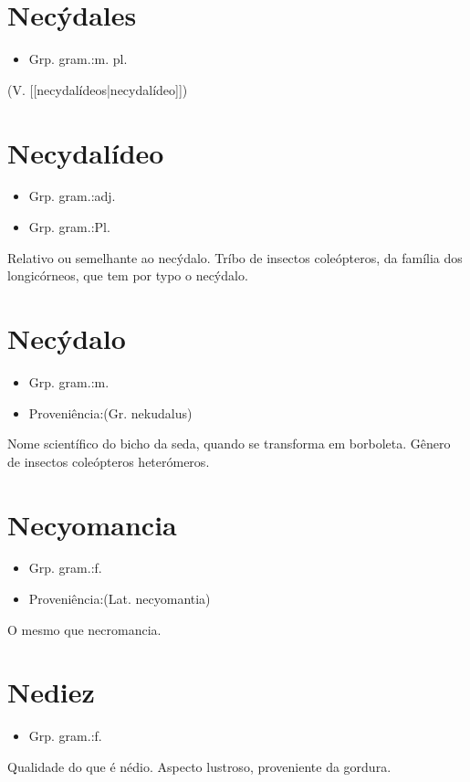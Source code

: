 \section{Necýdales}
\begin{itemize}
\item {Grp. gram.:m. pl.}
\end{itemize}
(V. [[necydalídeos|necydalídeo]])
\section{Necydalídeo}
\begin{itemize}
\item {Grp. gram.:adj.}
\end{itemize}
\begin{itemize}
\item {Grp. gram.:Pl.}
\end{itemize}
Relativo ou semelhante ao necýdalo.
Tríbo de insectos coleópteros, da família dos longicórneos, que tem por typo o necýdalo.
\section{Necýdalo}
\begin{itemize}
\item {Grp. gram.:m.}
\end{itemize}
\begin{itemize}
\item {Proveniência:(Gr. \textunderscore nekudalus\textunderscore )}
\end{itemize}
Nome scientífico do bicho da seda, quando se transforma em borboleta.
Gênero de insectos coleópteros heterómeros.
\section{Necyomancia}
\begin{itemize}
\item {Grp. gram.:f.}
\end{itemize}
\begin{itemize}
\item {Proveniência:(Lat. \textunderscore necyomantia\textunderscore )}
\end{itemize}
O mesmo que \textunderscore necromancia\textunderscore .
\section{Nediez}
\begin{itemize}
\item {Grp. gram.:f.}
\end{itemize}
Qualidade do que é nédio.
Aspecto lustroso, proveniente da gordura.
